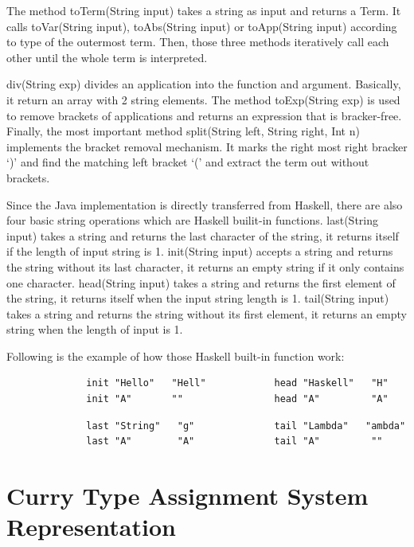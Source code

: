 \documentclass[a4paper,11pt,twoside]{report}
\begin{document}
The method \textsf{toTerm(String input)} takes a string as input and returns a \textsf{Term}. It calls \textsf{toVar(String input), toAbs(String input)} or \textsf{toApp(String input)} according to type of the outermost term. Then, those three methods iteratively call each other until the whole term is interpreted.   

\textsf{div(String exp)} divides an application into the function and argument. Basically, it return an array with 2 string elements. The method \textsf{toExp(String exp)} is used to remove brackets of applications and returns an expression that is bracker-free. Finally, the most important method \textsf{split(String left, String right, Int n)} implements the bracket removal mechanism. It marks the right most right bracker `)' and find the matching left bracket `(' and extract the term out without brackets.

Since the Java implementation is directly transferred from Haskell, there are also four basic string operations which are Haskell builit-in functions. \textsf{last(String input)} takes a string and returns the last character of the string, it returns itself if the length of input string is 1. \textsf{init(String input)} accepts a string and returns the string without its last character, it returns an empty string if it only contains one character. \textsf{head(String input)} takes a string and returns the first element of the string, it returns itself when the input string length is 1. \textsf{tail(String input)} takes a string and returns the string without its first element, it returns an empty string when the length of input is 1. 

Following is the example of how those Haskell built-in function work:

\begin{verbatim}
              init "Hello"   "Hell"            head "Haskell"   "H" 
              init "A"       ""                head "A"         "A"
\end{verbatim}

\begin{verbatim}
              last "String"   "g"              tail "Lambda"   "ambda" 
              last "A"        "A"              tail "A"         ""
\end{verbatim}


\section{Curry Type Assignment System Representation}
\end{document}
